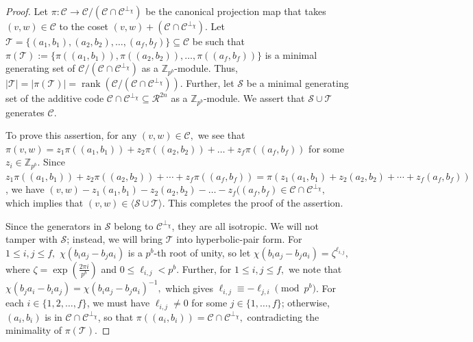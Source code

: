 \documentclass{article}
\DeclareMathOperator{\rank}{rank}
\theoremstyle{remark}
\theoremstyle{definition}
\numberwithin{equation}{section}
\begin{document}
\begin{proof} 
Let $\pi : \mathcal{C}  \to \mathcal{C}/(\mathcal{C} \cap \mathcal{C}^{\perp_\chi})$ be the canonical projection map that takes $(v,w) \in \mathcal{C}$ to the coset $(v,w) + (\mathcal{C} \cap \mathcal{C}^{\perp_\chi})$. Let $\mathcal{T}=\{(a_1,b_1),(a_2,b_2),\ldots,(a_f,b_f)\} \subseteq \mathcal{C} $ be such that $\pi(\mathcal{T}) := \{\pi((a_1,b_1)),\pi((a_2,b_2)),\ldots,\pi((a_f,b_f))\}$ is a minimal generating set of $\mathcal{C}/(\mathcal{C} \cap \mathcal{C}^{\perp_\chi})$ as a $\mathbb{Z}_{p^b}$-module. Thus, $|\mathcal{T}| = |\pi(\mathcal{T})| = \rank(\mathcal{C}/(\mathcal{C} \cap \mathcal{C}^{\perp_\chi}))$.
Further,  let $\mathcal{S}$ be a minimal generating set of the additive code $\mathcal{C} \cap \mathcal{C}^{\perp_\chi}  \subseteq \mathcal{R}^{2n}$ as a $\mathbb{Z}_{p^b}$-module.
 We assert that  $\mathcal{S} \cup \mathcal{T}$ generates $\mathcal{C}$.
 
To prove this assertion,  for any $(v,w) \in \mathcal{C},$ we see that
$\pi(v,w)=z_1\pi((a_1,b_1))+z_2\pi((a_2,b_2))+\ldots+z_f\pi((a_f,b_f))$ 
for some $z_i \in \mathbb{Z}_{p^b}.$  Since $z_1 \pi((a_1,b_1)) + z_2\pi((a_2,b_2)) + \cdots + z_f \pi((a_f,b_f)) = \pi (z_1 (a_1,b_1) + z_2 (a_2,b_2) + \cdots + z_f (a_f,b_f))$, we have $(v,w)-z_1(a_1,b_1)-z_2(a_2,b_2)-\ldots-z_f((a_f,b_f) \in \mathcal{C} \cap \mathcal{C}^{\perp_\chi},$ which implies that $(v,w) \in \langle \mathcal{S} \cup \mathcal{T} \rangle$. This completes the proof of the assertion.


Since the generators in $\mathcal{S}$ belong to $\mathcal{C}^{\perp_\chi}$, they are all isotropic. We will not tamper with $\mathcal{S}$; instead, we will bring $\mathcal{T}$ into hyperbolic-pair form. For $1 \leq i,j \leq f,$ $\chi(b_ia_j-b_ja_i)$ is a $p^b$-th root of unity, so let $\chi(b_ia_j-b_ja_i)=\zeta^{\ell_{i,j}},$ where $\zeta = \exp(\frac{2\pi i}{p^b})$ and $0\leq \ell_{i,j} < p^b.$ Further, for $1 \leq i,j \leq f,$ we note that $\chi(b_ja_i-b_ia_j)=\chi(b_ia_j-b_ja_i)^{-1},$ which gives $\ell_{i,j} \equiv -\ell_{j,i} \pmod{p^b}$. For each $i \in \{1,2,\ldots,f\}$, we must have $\ell_{i,j} \ne 0$ for some $j \in \{1,\ldots,f\}$; otherwise, $(a_i,b_i)$ is in $\mathcal{C} \cap \mathcal{C}^{\perp_\chi}$, so that $\pi((a_i,b_i))=\mathcal{C} \cap \mathcal{C}^{\perp_\chi},$ contradicting the minimality of $\pi(\mathcal{T})$.


\end{proof}
\end{document}
